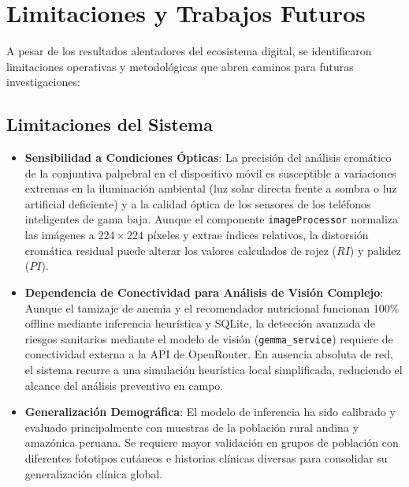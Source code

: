 \section{Limitaciones y Trabajos Futuros}
\label{sec:limitaciones}

A pesar de los resultados alentadores del ecosistema digital, se identificaron limitaciones operativas y metodológicas que abren caminos para futuras investigaciones:

\subsection{Limitaciones del Sistema}
\begin{itemize}
    \item \textbf{Sensibilidad a Condiciones Ópticas}: La precisión del análisis cromático de la conjuntiva palpebral en el dispositivo móvil es susceptible a variaciones extremas en la iluminación ambiental (luz solar directa frente a sombra o luz artificial deficiente) y a la calidad óptica de los sensores de los teléfonos inteligentes de gama baja. Aunque el componente \texttt{imageProcessor} normaliza las imágenes a $224 \times 224$ píxeles y extrae índices relativos, la distorsión cromática residual puede alterar los valores calculados de rojez ($RI$) y palidez ($PI$).
    \item \textbf{Dependencia de Conectividad para Análisis de Visión Complejo}: Aunque el tamizaje de anemia y el recomendador nutricional funcionan 100\% offline mediante inferencia heurística y SQLite, la detección avanzada de riesgos sanitarios mediante el modelo de visión (\texttt{gemma\_service}) requiere de conectividad externa a la API de OpenRouter. En ausencia absoluta de red, el sistema recurre a una simulación heurística local simplificada, reduciendo el alcance del análisis preventivo en campo.
    \item \textbf{Generalización Demográfica}: El modelo de inferencia ha sido calibrado y evaluado principalmente con muestras de la población rural andina y amazónica peruana. Se requiere mayor validación en grupos de población con diferentes fototipos cutáneos e historias clínicas diversas para consolidar su generalización clínica global.
\end{itemize}

